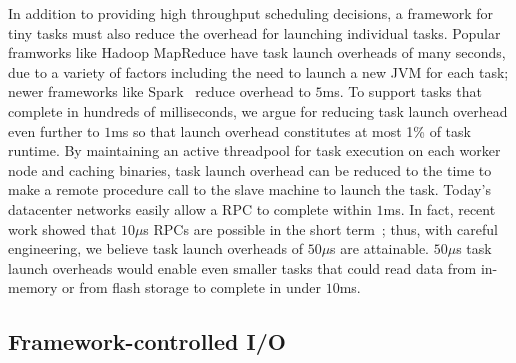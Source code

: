 In addition to providing high throughput scheduling decisions, a framework for
tiny tasks must also reduce the overhead for launching individual tasks.
Popular framworks like Hadoop MapReduce have task launch overheads of many
seconds, due to a variety of factors including the need to launch a new
JVM for each task; newer frameworks like Spark~\cite{zaharia2010spark} reduce
overhead to $5$ms.
To support tasks that complete in hundreds of milliseconds, we argue for
reducing task launch overhead even further to $1$ms so that launch overhead
constitutes at most 1\% of task runtime.
By maintaining an active threadpool for task execution on each worker node
and caching binaries, task launch overhead can be reduced to the time to
make
 a remote procedure
call to the slave machine to launch the task. Today's datacenter networks
easily allow a RPC to complete within $1$ms. In fact, recent work showed that
$10\mu$s RPCs are possible in the short term~\cite{low-latency}; thus,
with careful engineering, we believe task launch overheads of $50\mu$s are
attainable. $50\mu$s task launch overheads would enable even smaller tasks
that could read data from in-memory or from flash storage to complete
in under $10$ms.
\subsection{Framework-controlled I/O}
\label{sec:pipeline}

